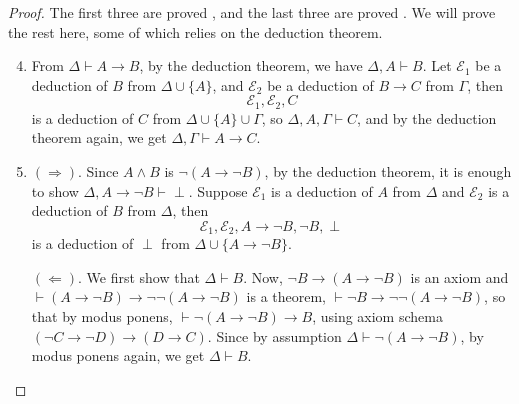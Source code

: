 \documentclass[12pt]{article}
\begin{document}
\begin{proof}  The first three are proved , and the last three are proved .  We will prove the rest here, some of which relies on the deduction theorem.

\begin{enumerate}
\setcounter{enumi}{3}
\item
From $\Delta \vdash A\to B$, by the deduction theorem, we have $\Delta, A\vdash B$.  Let $\mathcal{E}_1$ be a deduction of $B$ from $\Delta \cup \lbrace A \rbrace$, and $\mathcal{E}_2$ be a deduction of $B\to C$ from $\Gamma$, then $$\mathcal{E}_1, \mathcal{E}_2, C$$ is a deduction of $C$ from $\Delta\cup \lbrace A\rbrace \cup \Gamma$, so $\Delta, A, \Gamma \vdash C$, and by the deduction theorem again, we get $\Delta, \Gamma \vdash A\to C$.
\item
$(\Rightarrow)$.  Since $A\land B$ is $\neg (A\to \neg B)$, by the deduction theorem, it is enough to show $\Delta, A\to \neg B \vdash \perp$.  Suppose $\mathcal{E}_1$ is a deduction of $A$ from $\Delta$ and $\mathcal{E}_2$ is a deduction of $B$ from $\Delta$, then $$\mathcal{E}_1, \mathcal{E}_2, A\to \neg B, \neg B, \perp$$ is a deduction of $\perp$ from $\Delta \cup \lbrace A\to \neg B\rbrace$.

$(\Leftarrow)$.  We first show that $\Delta \vdash B$.  Now, $\neg B \to (A\to \neg B)$ is an axiom and $\vdash (A\to \neg B) \to \neg \neg (A\to \neg B)$ is a theorem, $\vdash \neg B \to \neg \neg (A\to \neg B)$, so that by modus ponens, $\vdash \neg (A\to \neg B)\to B$, using axiom schema $(\neg C\to \neg D)\to (D\to C)$.  Since by assumption $\Delta \vdash \neg (A\to \neg B)$, by modus ponens again, we get $\Delta \vdash B$.


\end{enumerate}
\end{proof}
\end{document}
